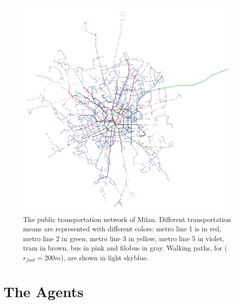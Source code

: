\begin{figure}
    \centering
    \includegraphics[scale = 0.5]{tex/pics/network_complete_cut.png}
    \caption{The public transportation network of Milan. Different transportation means are represented with different colors: metro line 1 is in red, metro line 2 in green, metro line 3 in yellow, metro line 5 in violet, tram in brown, bus in pink and filobus in gray. Walking paths, for ($r_{foot} = 200 m$), are shown in light skyblue.}
    \label{network_complete}
\end{figure}


 \section{The Agents}\label{sec:3.3}
 

